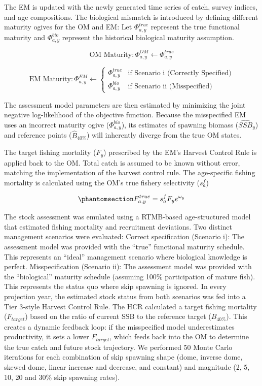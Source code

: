\documentclass[
  authoryear,
  preprint,
  3p]{elsarticle}
\begin{document}
The EM is updated with the newly generated time series of catch, survey
indices, and age compositions. The biological mismatch is introduced by
defining different maturity ogives for the OM and EM: Let
\(\Phi^{true}_{a,y}\) represent the true functional maturity and
\(\Phi^{bio}_{a,y}\) represent the historical biological maturity
assumption.

\[
\text{OM Maturity}: \Phi^{OM}_{a,y} \leftarrow \Phi^{true}_{a,y}
\]

\[
\text{EM Maturity}: \Phi^{EM}_{a,y} \leftarrow \begin{cases} \Phi^{true}_{a,y} & \text{if Scenario i (Correctly Specified)} \\ \Phi^{bio}_{a,y} & \text{if Scenario ii (Misspecified)} \end{cases}
\]

The assessment model parameters are then estimated by minimizing the
joint negative log-likelihood of the objective function. Because the
misspecified EM uses an incorrect maturity ogive (\(\Phi^{bio}_{a,y}\)),
its estimates of spawning biomass (\(\hat{SSB}_{y}\)) and reference
points (\(\hat{B}_{40\%}\)) will inherently diverge from the true OM
states.

The target fishing mortality (\(F_y\)) prescribed by the EM's Harvest
Control Rule is applied back to the OM. Total catch is assumed to be
known without error, matching the implementation of the harvest control
rule. The age-specific fishing mortality is calculated using the OM's
true fishery selectivity (\(s_a^f\))

\begin{equation}\protect\phantomsection\label{eq-f-true}{
F_{a,y}^{true} = s_a^f F_y e^{\omega_y}
}\end{equation}

The stock assessment \citep{William2023} was emulated using a RTMB-based
age-structured model that estimated fishing mortality and recruitment
deviations. Two distinct management scenarios were evaluated: Correct
specification (Scenario i): The assessment model was provided with the
``true'' functional maturity schedule. This represents an ``ideal''
management scenario where biological knowledge is perfect.
Misspecification (Scenario ii): The assessment model was provided with
the ``biological'' maturity schedule (assuming 100\% participation of
mature fish). This represents the status quo where skip spawning is
ignored. In every projection year, the estimated stock status from both
scenarios was fed into a Tier 3-style Harvest Control Rule. The HCR
calculated a target fishing mortality (\(F_{target}\)) based on the
ratio of current SSB to the reference target (\(B_{40\%}\)). This
creates a dynamic feedback loop: if the misspecified model
underestimates productivity, it sets a lower \(F_{target}\), which feeds
back into the OM to determine the true catch and future stock
trajectory. We performed 50 Monte Carlo iterations for each combination
of skip spawning shape (dome, inverse dome, skewed dome, linear increase
and decrease, and constant) and magnitude (2, 5, 10, 20 and 30\% skip
spawning rates).
\end{document}
